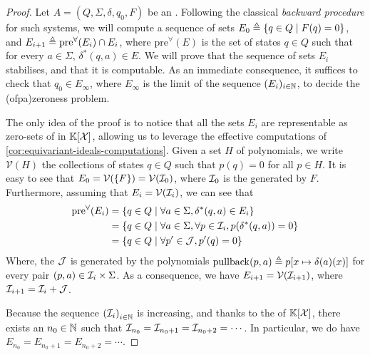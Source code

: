 \begin{proof}
  Let $A = (Q, \Sigma, \delta, q_0, F)$ be an . Following the classical \emph{backward procedure} for such
  systems, we will compute a sequence of sets $E_0 \triangleq \{  q \in Q  \mid 
  F(q) = 0  \}$, and $E_{i+1} \triangleq \mathrm{pre}^\forall(E_i) \cap E_i$, where
  $\mathrm{pre}^\forall(E)$ is the set of states $q \in Q$ such that for every
  $a \in \Sigma$, $\delta^*(q,a) \in E$. We will prove that the sequence of
  sets $E_i$ stabilises, and that it is computable. As an immediate
  consequence, it suffices to check that $q_0 \in E_{\infty}$, where $E_\infty$
  is the limit of the sequence $(E_i)_{i \in \mathbb{N}}$, to decide the
  \kl(ofpa){zeroness problem}.

  The only idea of the proof is to notice that all the sets $E_i$ are
  representable as zero-sets of  in
  $\mathbb{K}[\mathcal{X}]$, allowing us to leverage the effective computations of
  \cref{cor:equivariant-ideals-computations}. Given a set $H$ of polynomials,
  we write $\mathcal{V}(H)$ the collections of states $q \in Q$ such that $p(q)
  = 0$ for all $p \in H$.
  It is easy to see that $E_0 = \mathcal{V}(\set{F}) = \mathcal{V}(\idl_0)$,
  where $\idl_0$ is the  generated by $F$. 
  Furthermore, assuming that $E_i = \mathcal{V}(\idl_i)$, we can
  see that 
  \begin{align*}
    \mathrm{pre}^\forall(E_i) 
    & = \setof{ q \in Q }{ \forall a \in \Sigma, \delta^*(q,a) \in E_i } \\
    & = \setof{ q \in Q }{ \forall a \in \Sigma, \forall p \in \idl_i, p(\delta^*(q,a)) = 0 } \\
    & = \setof{ q \in Q }{ \forall p' \in \idl[J], p'(q) = 0 }
  \end{align*}
  Where, the  $\idl[J]$ is generated by the
  polynomials $\mathrm{pullback}(p,a) \triangleq p [ x \mapsto \delta(a)(x)]$
  for every pair $(p, a) \in \idl_i \times \Sigma$. 
  As a consequence, we have $E_{i+1} = \mathcal{V}(\idl_{i+1})$, where
  $\idl_{i+1} = \idl_i + \idl[J]$.

  Because the sequence $\seqof{ \idl_i }[ i \in \N]$ is increasing, and thanks
  to the  of $\mathbb{K}[\mathcal{X}]$, there
  exists an $n_0 \in \mathbb{N}$ such that $\idl_{n_0} = \idl_{n_0 + 1} = \idl_{n_0 +
  2} = \cdots$. In particular, we do have $E_{n_0} = E_{n_0 + 1} = E_{n_0 + 2}
  = \cdots$.


\end{proof}
